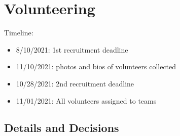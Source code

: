 \documentclass[%
10pt,								%
titlepage,						%
]
{scrartcl}
\begin{document}
\section{Volunteering}
    Timeline:
    \begin{itemize}
        \item   8/10/2021: 1st recruitment deadline
        \item   11/10/2021: photos and bios of volunteers collected
        \item   10/28/2021: 2nd recruitment deadline
        \item   11/01/2021: All volunteers assigned to teams
    \end{itemize}
    
    \subsection{Details and Decisions}
\end{document}
